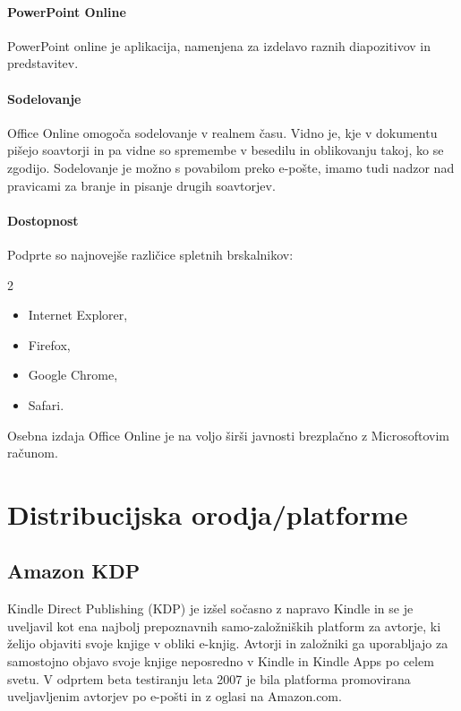 \documentclass[a4paper, 12pt]{book}
\begin{document}
\paragraph{PowerPoint Online}
PowerPoint online je aplikacija, namenjena za izdelavo raznih diapozitivov in predstavitev. 

\paragraph{Sodelovanje}
Office Online omogoča sodelovanje v realnem času. Vidno je, kje v dokumentu pišejo soavtorji in pa vidne so spremembe v besedilu in oblikovanju takoj, ko se zgodijo. Sodelovanje je možno s povabilom preko e-pošte, imamo tudi nadzor nad pravicami za branje in pisanje drugih soavtorjev.

\paragraph{Dostopnost}
Podprte so najnovejše različice spletnih brskalnikov: \cite{107}
\begin{multicols}{2}
	\begin{itemize}
		\item Internet Explorer,
		\item Firefox,
		\item Google Chrome,
		\item Safari.
	\end{itemize}
\end{multicols}
Osebna izdaja Office Online je na voljo širši javnosti brezplačno z Microsoftovim računom. 

\section{Distribucijska orodja/platforme}

\subsection{Amazon KDP}
Kindle Direct Publishing (KDP) je izšel sočasno z napravo Kindle in se je uveljavil kot ena najbolj prepoznavnih samo-založniških platform za avtorje, ki želijo objaviti svoje knjige v obliki e-knjig.  Avtorji in založniki ga uporabljajo za samostojno objavo svoje knjige neposredno v Kindle in Kindle Apps po celem svetu. V odprtem beta testiranju leta 2007 je bila platforma promovirana uveljavljenim avtorjev po e-pošti \cite{44} in z oglasi na Amazon.com.
\end{document}
